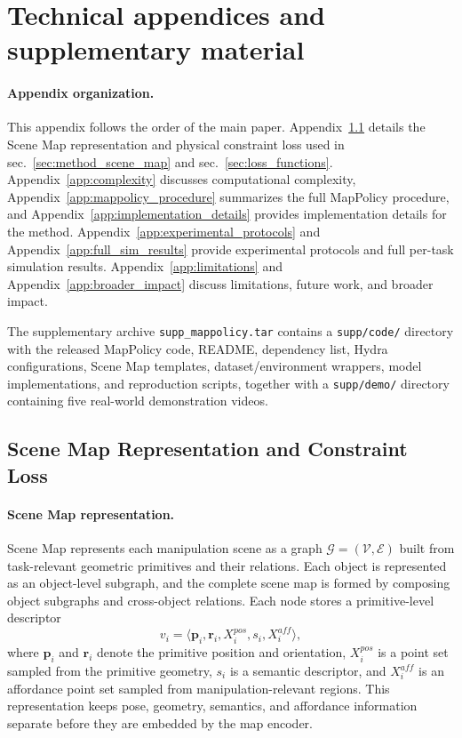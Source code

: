 \section{Technical appendices and supplementary material}
\paragraph{Appendix organization.}
This appendix follows the order of the main paper. Appendix~\ref{app:scene_map_constraint} details the Scene Map representation and physical constraint loss used in sec.~\ref{sec:method_scene_map} and sec.~\ref{sec:loss_functions}. Appendix~\ref{app:complexity} discusses computational complexity, Appendix~\ref{app:mappolicy_procedure} summarizes the full MapPolicy procedure, and Appendix~\ref{app:implementation_details} provides implementation details for the method. Appendix~\ref{app:experimental_protocols} and Appendix~\ref{app:full_sim_results} provide experimental protocols and full per-task simulation results. Appendix~\ref{app:limitations} and Appendix~\ref{app:broader_impact} discuss limitations, future work, and broader impact.

The supplementary archive \texttt{supp\_mappolicy.tar} contains a \texttt{supp/code/} directory with the released MapPolicy code, README, dependency list, Hydra configurations, Scene Map templates, dataset/environment wrappers, model implementations, and reproduction scripts, together with a \texttt{supp/demo/} directory containing five real-world demonstration videos.

\subsection{Scene Map Representation and Constraint Loss}
\label{app:scene_map_constraint}

\paragraph{Scene Map representation.}
Scene Map represents each manipulation scene as a graph $\mathcal{G}=(\mathcal{V},\mathcal{E})$ built from task-relevant geometric primitives and their relations. Each object is represented as an object-level subgraph, and the complete scene map is formed by composing object subgraphs and cross-object relations. Each node stores a primitive-level descriptor
\begin{equation}
v_i = \langle \mathbf{p}_i, \mathbf{r}_i, X_i^{pos}, s_i, X_i^{aff} \rangle ,
\end{equation}
where $\mathbf{p}_i$ and $\mathbf{r}_i$ denote the primitive position and orientation, $X_i^{pos}$ is a point set sampled from the primitive geometry, $s_i$ is a semantic descriptor, and $X_i^{aff}$ is an affordance point set sampled from manipulation-relevant regions. This representation keeps pose, geometry, semantics, and affordance information separate before they are embedded by the map encoder.

